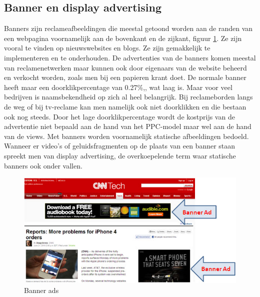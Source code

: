 \documentclass[pdftex,a4paper,12pt,twoside]{report}
\begin{document}
\subsection{Banner en display advertising }
\label{sec Banner en display advertising }
Banners zijn reclameafbeeldingen die meestal getoond worden aan de randen van een webpagina voornamelijk aan de bovenkant en de zijkant, figuur \ref{fig: Banner-Ads}. Ze zijn vooral te vinden op nieuwswebsites en blogs. Ze zijn gemakkelijk te implementeren en te onderhouden. De advertenties van de banners komen meestal van reclamenetwerken maar kunnen ook door eigenaars van de website beheerd en verkocht worden, zoals men bij een papieren krant doet. De normale banner heeft maar een doorklikpercentage van 0.27\%,\cite{Chaffey2016}, wat laag is. Maar voor veel bedrijven is naamsbekendheid op zich al heel belangrijk. Bij reclameborden langs de weg of bij tv-reclame kan men namelijk ook niet doorklikken en die bestaan ook nog steeds. Door het lage doorklikpercentage wordt de kostprijs van de advertentie niet bepaald aan de hand van het PPC-model maar wel aan de hand van de views. Met banners worden voornamelijk statische afbeeldingen bedoeld. Wanneer er video's of geluidsfragmenten op de plaats van een banner staan spreekt men van display advertising, de overkoepelende term waar statische banners ook onder vallen.
\begin{figure}[h!]
\centering
\includegraphics[width=12cm]{img/Banner-Ads}
\caption{Banner ads}
\label{fig: Banner-Ads}
\end{figure}
\end{document}
